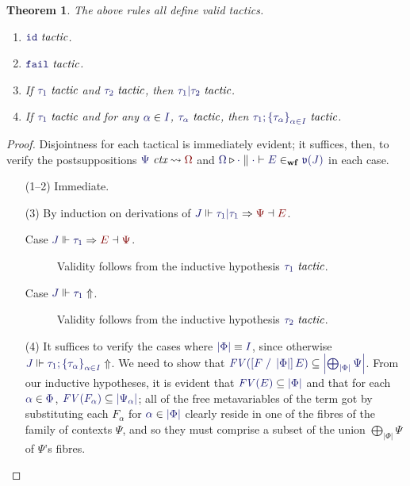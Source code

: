 \documentclass[11pt]{article}
\newtheorem{thm}{Theorem}[section]
\theoremstyle{definition}
\theoremstyle{remark}
\numberwithin{equation}{section}
\def\IModeColorName{MidnightBlue}
\def\OModeColorName{Maroon}
\newcommand\IMode[1]{{\color{\IModeColorName}{#1}}}
\newcommand\OMode[1]{{\color{\OModeColorName}{#1}}}
\newcommand\JJ{J}
\newcommand\IsTac[1]{\IMode{#1}\ \textit{tactic}}
\newcommand\MkSet[1]{\left\{#1\right\}}
\newcommand\MkFam[3]{\MkSet{#1_{#2}}_{#2\in #3}}
\newcommand\IsWf[5]{%
  \IMode{#1}\triangleright%
  \IMode{#2}\parallel%
  \IMode{#3}\vdash%
  \IMode{#4}\in_{\mathbf{wf}}\IMode{#5}%
}
\newcommand\IsCtx[2]{
  \IMode{#1}\ \textit{ctx}\leadsto \OMode{#2}
}
\newcommand\JdgValence[1]{\mathfrak{v}(#1)}
\newcommand\Refine[4]{\IMode{#1}\Vdash\IMode{#2}\Rightarrow\OMode{#4}\dashv\OMode{#3}}
\newcommand\NoRefine[2]{\IMode{#1}\Vdash\IMode{#2}\Uparrow}
\newcommand\Member[2]{\IMode{#1}\in\IMode{#2}}
\newcommand\IdTac{\mathtt{id}}
\newcommand\FailTac{\mathtt{fail}}
\newcommand\OrElseTac[2]{#1\vert#2}
\newcommand\ThenTac[2]{#1;#2}
\newcommand\Dom[1]{\left\vert#1\right\vert}
\newcommand\SubsetEq[2]{\IMode{#1}\subseteq\IMode{#2}}
\newcommand\FV[1]{\textit{FV}\left(#1\right)}
\newcommand\Subst[3]{\left[#1\;/\;#2\right]#3}
\newcommand\IsEquiv[2]{\IMode{#1}\equiv\IMode{#2}}
\begin{document}
\begin{thm}
  The above rules all define valid tactics.
  \begin{enumerate}
    \item $\IsTac{\IdTac}$.
    \item $\IsTac{\FailTac}$.
    \item If $\IsTac{\tau_1}$ and $\IsTac{\tau_2}$, then
      $\IsTac{\OrElseTac{\tau_1}{\tau_2}}$.

    \item If $\IsTac{\tau_1}$ and for any $\Member{\alpha}{I}$,
      $\IsTac{\tau_\alpha}$, then
      $\IsTac{\ThenTac{\tau_1}{\MkFam{\tau}{\alpha}{I}}}$.
  \end{enumerate}
\end{thm}
\begin{proof}
  Disjointness for each tactical is immediately evident; it suffices, then, to
  verify the postsuppositions $\IsCtx{\Psi}{\Omega}$ and
  $\IsWf{\Omega}{\cdot}{\cdot}{E}{\JdgValence{\JJ}}$ in each case.
  \begin{enumerate}
    \item[(1--2)] Immediate.
    \item[(3)]
      By induction on derivations of
      $\Refine{\JJ}{\OrElseTac{\tau_1}{\tau_1}}{E}{\Psi}$.
      \begin{description}
        \item[Case $\Refine{\JJ}{\tau_1}{\Psi}{E}$.] Validity follows from the
          inductive hypothesis $\IsTac{\tau_1}$.
        \item[Case $\NoRefine{\JJ}{\tau_1}$.] Validity follows from the
          inductive hypothesis $\IsTac{\tau_2}$.
      \end{description}

    \item[(4)] It suffices to verify the cases where
      $\IsEquiv{\Dom\Phi}{I}$, since otherwise
      $\NoRefine{\JJ}{\ThenTac{\tau_1}{\MkFam{\tau}{\alpha}{I}}}$.
      We need to show that
      $\SubsetEq{\FV{\Subst{F}{\Dom\Phi}{E}}}{\Dom{\bigoplus_{\Dom\Phi}\Psi}}$.
      From our inductive hypotheses, it is evident that
      $\SubsetEq{\FV{E}}{\Dom\Phi}$ and that for each $\Member{\alpha}{\Phi}$,
      $\SubsetEq{\FV{F_\alpha}}{\Dom{\Psi_\alpha}}$; all of the free metavariables
      of the term got by substituting each $F_\alpha$ for
      $\Member{\alpha}{\Dom\Phi}$ clearly reside in one of the fibres of the
      family of contexts $\Psi$, and so they must comprise a subset of the
      union $\bigoplus_{\Dom\Phi}\Psi$ of $\Psi$'s fibres.

  \end{enumerate}
\end{proof}
\end{document}
